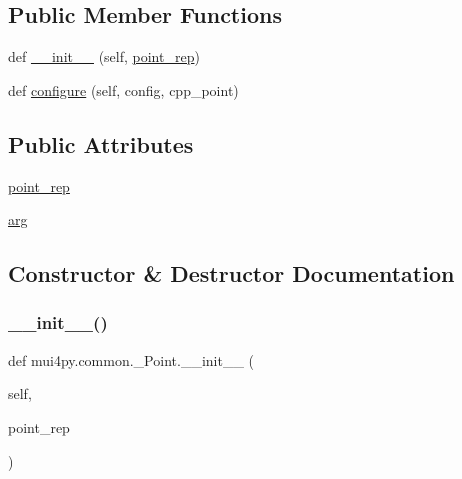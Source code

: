 \subsection*{Public Member Functions}
\begin{DoxyCompactItemize}
\item 
def \hyperlink{classmui4py_1_1common_1_1___point_a7792905e360a77e20f8b6cee900f21c0}{\+\_\+\+\_\+init\+\_\+\+\_\+} (self, \hyperlink{classmui4py_1_1common_1_1___point_a337dfb20de4ddaf91b00f97009b2f802}{point\+\_\+rep})
\item 
def \hyperlink{classmui4py_1_1common_1_1___point_af56797381e5a36d073213329cd16a757}{configure} (self, config, cpp\+\_\+point)
\end{DoxyCompactItemize}
\subsection*{Public Attributes}
\begin{DoxyCompactItemize}
\item 
\hyperlink{classmui4py_1_1common_1_1___point_a337dfb20de4ddaf91b00f97009b2f802}{point\+\_\+rep}
\item 
\hyperlink{classmui4py_1_1common_1_1___point_a4559e5eb1b5dfbcd2f364874d9708671}{arg}
\end{DoxyCompactItemize}


\subsection{Constructor \& Destructor Documentation}
\mbox{\label{classmui4py_1_1common_1_1___point_a7792905e360a77e20f8b6cee900f21c0}} 
\subsubsection{\texorpdfstring{\+\_\+\+\_\+init\+\_\+\+\_\+()}{\_\_init\_\_()}}
{\footnotesize\ttfamily def mui4py.\+common.\+\_\+\+Point.\+\_\+\+\_\+init\+\_\+\+\_\+ (\begin{DoxyParamCaption}\item[{}]{self,  }\item[{}]{point\+\_\+rep }\end{DoxyParamCaption})}



